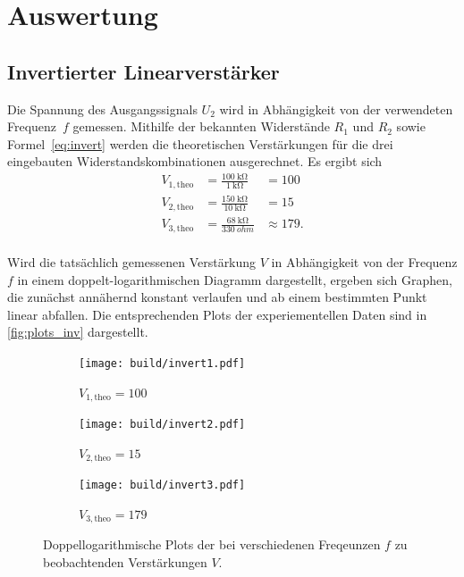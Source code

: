 \section{Auswertung}
\label{sec:Auswertung}

\subsection{Invertierter Linearverstärker}
\label{sec:Invertierter_Linearverstärker}
Die Spannung des Ausgangssignals $U_2$ wird in Abhängigkeit von der verwendeten Frequenz~$f$ gemessen. Mithilfe
der bekannten Widerstände $R_1$ und $R_2$ sowie Formel~\eqref{eq:invert} werden die theoretischen Verstärkungen für die drei eingebauten
Widerstandskombinationen ausgerechnet. Es ergibt sich
\begin{align*}
  V_{1, \mathrm{theo}} &= \frac{\qty{100}{\kilo\ohm}}{\qty{1}{\kilo\ohm}} &= \num{100} \\
  V_{2, \mathrm{theo}} &= \frac{\qty{150}{\kilo\ohm}}{\qty{10}{\kilo\ohm}} &= \num{15} \\
  V_{3, \mathrm{theo}} &= \frac{\qty{68}{\kilo\ohm}}{\qty{330}{ohm}} &\approx \num{179}. \\  
\end{align*}

Wird die tatsächlich gemessenen Verstärkung $V$ in Abhängigkeit von der Frequenz $f$ in einem doppelt-logarithmischen Diagramm dargestellt,
ergeben sich Graphen, die zunächst annähernd konstant verlaufen und ab einem bestimmten Punkt linear abfallen. Die entsprechenden Plots
der experiementellen Daten sind in \autoref{fig:plots_inv} dargestellt.

\begin{figure}
  \begin{subfigure}[c]{0.9\textwidth}
    \centering
    \texttt{[image: build/invert1.pdf]}
    \caption{$V_{1, \mathrm{theo}} = 100$}
  \end{subfigure}
  \begin{subfigure}[c]{0.9\textwidth}
    \centering
    \texttt{[image: build/invert2.pdf]}
    \caption{$V_{2, \mathrm{theo}} = 15$}
  \end{subfigure}
  \begin{subfigure}[c]{0.9\textwidth}
    \centering
    \texttt{[image: build/invert3.pdf]}
    \caption{$V_{3, \mathrm{theo}} = 179$}
  \end{subfigure}
  \caption{Doppellogarithmische Plots der bei verschiedenen Freqeunzen $f$ zu beobachtenden Verstärkungen $V$.}
  \label{fig:plots_inv}
\end{figure}

